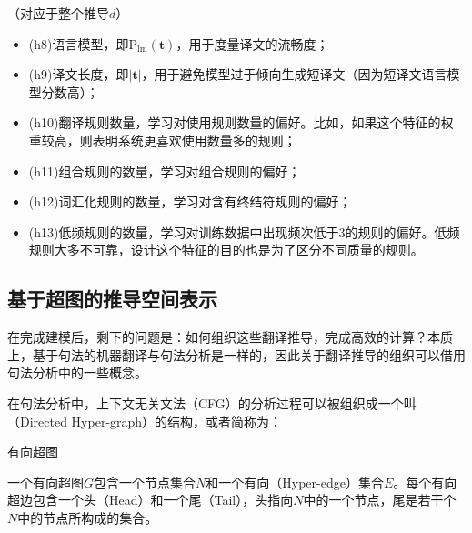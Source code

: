 \vspace{0.5em}
（对应于整个推导$d$）

\begin{itemize}
\vspace{0.5em}
\item (h8)语言模型，即$\textrm{P}_{\textrm{lm}}(\mathbf{t})$，用于度量译文的流畅度；
\vspace{0.5em}
\item (h9)译文长度，即$|\mathbf{t}|$，用于避免模型过于倾向生成短译文（因为短译文语言模型分数高）；
\vspace{0.5em}
\item (h10)翻译规则数量，学习对使用规则数量的偏好。比如，如果这个特征的权重较高，则表明系统更喜欢使用数量多的规则；
\vspace{0.5em}
\item (h11)组合规则的数量，学习对组合规则的偏好；
\vspace{0.5em}
\item (h12)词汇化规则的数量，学习对含有终结符规则的偏好；
\vspace{0.5em}
\item (h13)低频规则的数量，学习对训练数据中出现频次低于3的规则的偏好。低频规则大多不可靠，设计这个特征的目的也是为了区分不同质量的规则。
\end{itemize}

\vspace{0.5em}


\subsection{基于超图的推导空间表示}

\parinterval 在完成建模后，剩下的问题是：如何组织这些翻译推导，完成高效的计算？本质上，基于句法的机器翻译与句法分析是一样的，因此关于翻译推导的组织可以借用句法分析中的一些概念。

\parinterval 在句法分析中，上下文无关文法（CFG）的分析过程可以被组织成一个叫{\small{}}（Directed Hyper-graph）的结构，或者简称为{\small{}}\cite{ilprints729}：

\vspace{0.5em}
\begin{definition} 有向超图

{\small
一个有向超图$G$包含一个节点集合$N$和一个有向{\small{}}（Hyper-edge）集合$E$。每个有向超边包含一个头（Head）和一个尾（Tail），头指向$N$中的一个节点，尾是若干个$N$中的节点所构成的集合。
}
\end{definition}

